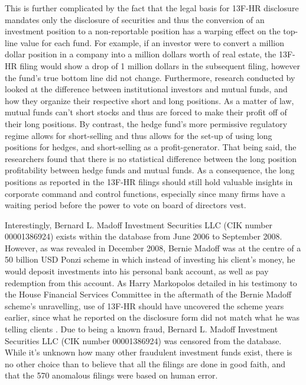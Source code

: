 This is further complicated by the fact that the legal basis for 13F-HR disclosure mandates only the disclosure of securities and thus the conversion of an investment position to a non-reportable position has a warping effect on the top-line value for each fund. For example, if an investor were to convert a million dollar position in a company into a million dollars worth of real estate, the 13F-HR filing would show a drop of 1 million dollars in the subsequent filing, however the fund's true bottom line did not change.  Furthermore, research conducted by \cite{griffinhow2009} looked at the difference between institutional investors and mutual funds, and how they organize their respective short and long positions.  As a matter of law, mutual funds can't short stocks and thus are forced to make their profit off of their long positions.  By contrast, the hedge fund's more permissive regulatory regime allows for short-selling and thus allows for the set-up of using long positions for hedges, and short-selling as a profit-generator.  That being said, the researchers found that there is no statistical difference between the long position profitability between hedge funds and mutual funds.  As a consequence, the long positions as reported in the 13F-HR filings should still hold valuable insights in corporate command and control functions, especially since many firms have a waiting period before the power to vote on board of directors vest.  




Interestingly, Bernard L. Madoff Investment Securities LLC (CIK number 00001386924) exists within the database from June 2006 to September 2008.  However, as was revealed in December 2008, Bernie Madoff was at the centre of a 50 billion USD Ponzi scheme \citep{Appelbaum2008} in which instead of investing his client's money, he would deposit investments into his personal bank account, as well as pay redemption from this account.   As Harry Markopolos detailed in his testimony to the House Financial Services Committee in the aftermath of the Bernie Madoff scheme's unravelling, use of 13F-HR should have uncovered the scheme years earlier, since what he reported on the disclosure form did not match what he was telling clients \citep{Marko09}.   Due to being a known fraud,  Bernard L. Madoff Investment Securities LLC (CIK number 00001386924) was censored from the database.  While it's unknown how many other fraudulent investment funds exist, there is no other choice than to believe that all the filings are done in good faith, and that the 570 anomalous filings were based on human error.  

